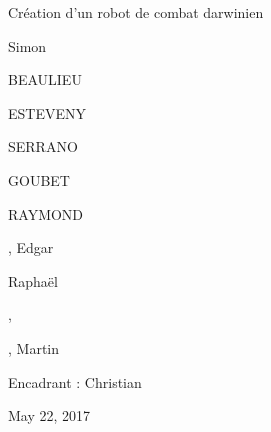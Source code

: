 \documentclass[a4paper,portrait,12pt]{article}
\begin{document}
\begin{flushleft}
Cr\'{e}ation d'un robot de combat darwinien
\end{flushleft}


\begin{flushleft}
Simon
\end{flushleft}





\begin{flushleft}
BEAULIEU
\end{flushleft}


\begin{flushleft}
ESTEVENY
\end{flushleft}





\begin{flushleft}
SERRANO
\end{flushleft}


\begin{flushleft}
GOUBET
\end{flushleft}


\begin{flushleft}
RAYMOND
\end{flushleft}





\begin{flushleft}
, Edgar
\end{flushleft}





\begin{flushleft}
Rapha\"{e}l
\end{flushleft}





,





\begin{flushleft}
, Martin
\end{flushleft}





\begin{flushleft}
Encadrant : Christian
\end{flushleft}





\begin{flushleft}
May 22, 2017
\end{flushleft}
\end{document}
